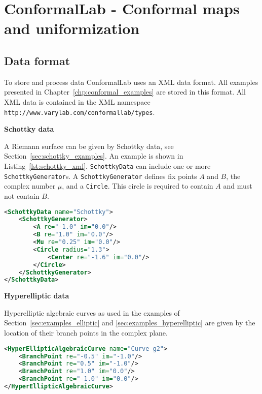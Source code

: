 \documentclass[Thesis.tex]{subfiles}
\begin{document}
\chapter{{\sc ConformalLab} - Conformal maps and uniformization}
\label{chp:conformallab}

\section{Data format}
\label{sec:conformal_data}
To store and process data {\sc ConformalLab} uses an {\sc XML} data format.
All examples presented in Chapter~\ref{chp:conformal_examples} are stored
in this format. 
All XML data is contained in the XML namespace 
{\tt http://www.varylab.com/conformallab/types}.


{\bf Schottky data} 

A Riemann surface can be given by Schottky data, see Section~\ref{sec:schottky_examples}. An example is shown in Listing~\ref{lst:schottky_xml}. {\tt SchottkyData} can include one or more {\tt SchottkyGenerator}s. A {\tt SchottkyGenerator} defines fix points $A$ and $B$, the complex number $\mu$, and a {\tt Circle}. This circle is required to contain $A$ and must not contain $B$.

\begin{lstlisting}[label=lst:schottky_xml, caption={A torus given by schotty data}, numbers=none, language=XML, captionpos=b]
<SchottkyData name="Schottky">
	<SchottkyGenerator>
		<A re="-1.0" im="0.0"/>
		<B re="1.0" im="0.0"/>
		<Mu re="0.25" im="0.0"/>
		<Circle radius="1.3">
			<Center re="-1.6" im="0.0"/>
		</Circle>
	</SchottkyGenerator>
</SchottkyData>
\end{lstlisting}

{\bf Hyperelliptic data} 

Hyperelliptic algebraic curves as used in the examples of Section~\ref{sec:examples_elliptic} and \ref{sec:examples_hyperelliptic} are given by the location of their branch points in the complex plane.

\begin{lstlisting}[label=lst:hyperelliptic_xml, caption={A torus given as hyperelliptic data}, numbers=none, language=XML, captionpos=b]
<HyperEllipticAlgebraicCurve name="Curve g2">
	<BranchPoint re="-0.5" im="-1.0"/>
	<BranchPoint re="0.5" im="-1.0"/>
	<BranchPoint re="1.0" im="0.0"/>
	<BranchPoint re="-1.0" im="0.0"/>
</HyperEllipticAlgebraicCurve>
\end{lstlisting}
\end{document}
